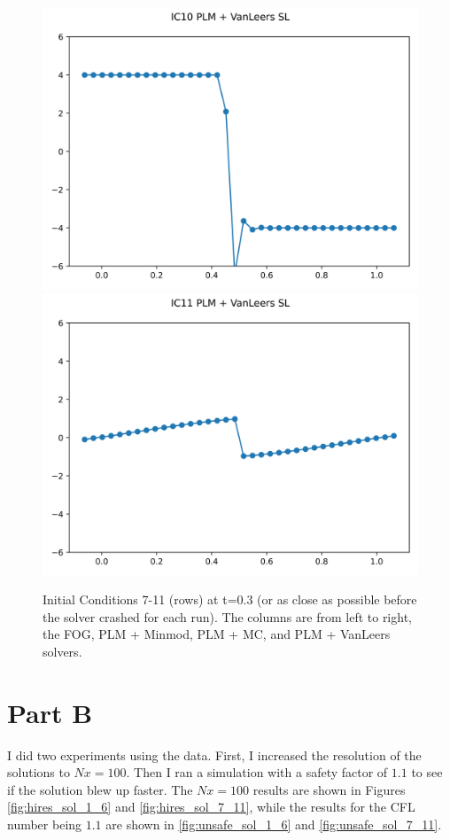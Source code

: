 \documentclass{article}
\begin{document}
\begin{figure}[t]
        \includegraphics[width=.95\textwidth]{../../code/IC10Methodpv_plot.png}
        \includegraphics[width=.95\textwidth]{../../code/IC11Methodpv_plot.png}
    \emp
    \caption{Initial Conditions 7-11 (rows) at t=0.3 (or as close as possible before the
    solver crashed for each run). The columns are from left to right, the FOG,
    PLM + Minmod, PLM + MC, and PLM + VanLeers solvers.}
    \label{fig:sol_7_11}
\end{figure}

\section{Part B}

I did two experiments using the data. First, I increased the resolution of the
solutions to $Nx = 100$. Then I ran a simulation with a safety factor of $1.1$
to see if the solution blew up faster. The $Nx = 100$ results are shown in
Figures \ref{fig:hires_sol_1_6} and \ref{fig:hires_sol_7_11}, while the results
for the CFL number being $1.1$ are shown in \ref{fig:unsafe_sol_1_6} and
\ref{fig:unsafe_sol_7_11}. 
\end{document}
